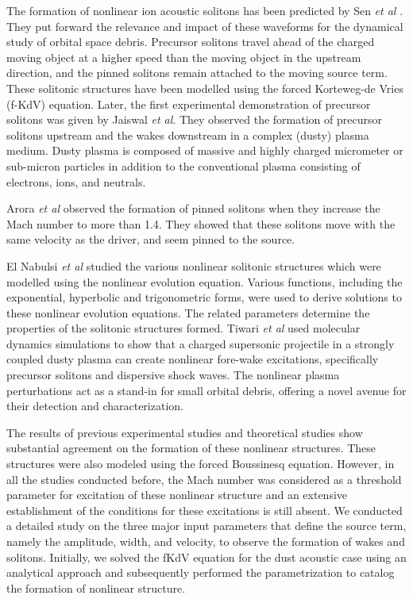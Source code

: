 \documentclass[%
 aip,
 amsmath,amssymb,
 reprint,%
]{revtex4-1}
\begin{document}
The formation of nonlinear ion acoustic solitons has been predicted by Sen \textit{et al} \cite{r1}. They put forward the relevance and impact of these waveforms for the dynamical study of orbital space debris.
Precursor solitons travel ahead of the charged moving object at a higher speed than the moving object in the upstream direction, and the pinned solitons remain attached to the moving source term. These solitonic structures have been modelled using the forced Korteweg-de Vries (f-KdV) equation\cite{r1,r2}. Later, the first experimental demonstration of precursor solitons was given by Jaiswal \textit{et al}\cite{r3}. They observed the formation of precursor solitons upstream and the wakes downstream in a complex (dusty) plasma medium. Dusty plasma is composed of massive and highly charged micrometer or sub-micron particles in addition to the conventional plasma consisting of electrons, ions, and neutrals. 
 
Arora \textit{et al} \cite{r5} observed the formation of pinned solitons when they increase the Mach number to more than 1.4. They showed that these solitons move with the same velocity as the driver, and seem pinned to the source. 

El Nabulsi \textit{et al} \cite{r17} studied the various nonlinear solitonic structures which were modelled using the nonlinear evolution equation. Various functions, including the exponential, hyperbolic and trigonometric forms, were used to derive solutions to these nonlinear evolution equations. The related parameters determine the properties of the solitonic structures formed. Tiwari \textit{et al} \cite{r18} used molecular dynamics simulations to show that a charged supersonic projectile in a strongly coupled dusty plasma can create nonlinear fore-wake excitations, specifically precursor solitons and dispersive shock waves. The nonlinear plasma perturbations act as a stand-in for small orbital debris, offering a novel avenue for their detection and characterization\cite{r19,r20,r21,r22}.
\par The results of previous experimental studies \cite{r3,r4,r5} and theoretical studies \cite{r1,r2,r6,r7,r23} show substantial agreement on the formation of these nonlinear structures. These structures were also modeled using the forced Boussinesq equation\cite{r24,r25,r26}. However, in all the studies conducted before, the Mach number was considered as a threshold parameter for excitation of these nonlinear structure and an extensive establishment of the conditions for these excitations is still absent. We conducted a detailed study on the three major input parameters that define the source term, namely the amplitude, width, and velocity, to observe the formation of wakes and solitons. Initially, we solved the fKdV equation for the dust acoustic case using an analytical approach and subsequently performed the parametrization to catalog the formation of nonlinear structure. 
\end{document}
